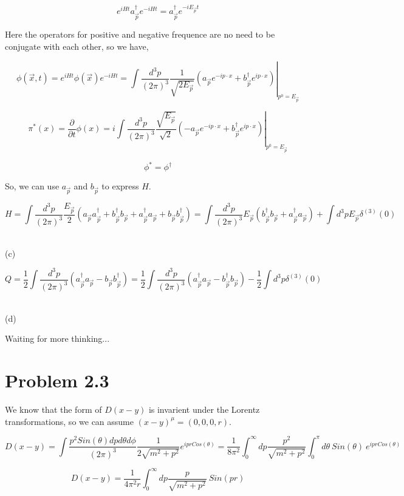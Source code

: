\documentclass[11pt]{article} %
\begin{document}
\[
    e^{i H t} a^{\dagger}_{\vec{p}} e^{-i H t}=a^{\dagger}_{\vec{p}} e^{-i E_{\vec{p}} t}    
\]

Here the operators for positive and negative frequence are no need to be conjugate with each other, so we have,

\[
    \phi(\vec{x}, t) = e^{i H t} \phi(\vec{x}) e^{-i H t} = \left.\int \frac{d^{3} p}{(2 \pi)^{3}} \frac{1}{\sqrt{2 E_{\vec{p}}}}\left(a_{\vec{p}} e^{-i p \cdot x}+b_{\vec{p}}^{\dagger} e^{i p \cdot x}\right)\right|_{p^{0}=E_{\vec{p}}}    
\]

\[
    \pi^*(x) = \frac{\partial}{\partial t} \phi(x) = i \left.\int \frac{d^{3} p}{(2 \pi)^{3}} \frac{\sqrt{E_{\vec{p}}}}{\sqrt{2}}\left( - a_{\vec{p}} e^{-i p \cdot x}+b_{\vec{p}}^{\dagger} e^{i p \cdot x}\right)\right|_{p^{0}=E_{\vec{p}}}       
\]

\[
    \phi^* = \phi^{\dagger}    
\]

So, we can use $a_{\vec{p}}$ and $b_{\vec{p}}$ to express $H$.

\[
    H = \int \frac{d^3 p}{(2\pi)^3} \frac{E_{\vec{p}}}{2} ( a_{\vec{p}} a^{\dagger}_{\vec{p}} + b^{\dagger}_{\vec{p}} b_{\vec{p}} + a^{\dagger}_{\vec{p}} a_{\vec{p}} + b_{\vec{p}} b^{\dagger}_{\vec{p}} ) = \int \frac{d^3 p}{(2\pi)^3} E_{\vec{p}} (b^{\dagger}_{\vec{p}} b_{\vec{p}} + a^{\dagger}_{\vec{p}} a_{\vec{p}}) + \int d^3 p E_{\vec{p}} \delta^{(3)}(0)
\]

~\\

\noindent (c)

\[
    Q = \frac{1}{2} \int \frac{d^3 p}{(2\pi)^3} (a^{\dagger}_{\vec{p}}a_{\vec{p}} - b_{\vec{p}}b^{\dagger}_{\vec{p}}) = \frac{1}{2} \int \frac{d^3 p}{(2\pi)^3} (a^{\dagger}_{\vec{p}}a_{\vec{p}} - b^{\dagger}_{\vec{p}}b_{\vec{p}}) - \frac{1}{2} \int d^3 p \delta^{(3)}(0)
\]


~\\

\noindent (d)

Waiting for more thinking...


\section{Problem 2.3}

We know that the form of $D(x-y)$ is invarient under the Lorentz transformations, so we can assume $(x-y)^\mu = (0, 0, 0, r)$.

\[
    D(x-y) = \int \frac{p^2 Sin(\theta) dp d\theta d\phi }{(2\pi)^3} \frac{1}{2 \sqrt{m^2 + p^2}} e^{i p r Cos(\theta)} = \frac{1}{8 \pi^2} \int^{\infty}_{0} dp \frac{p^2}{\sqrt{m^2 + p^2}} \int^{\pi}_{0} d\theta\ Sin(\theta)\ e^{i p r Cos(\theta)}
\]

\[
    D(x-y) = \frac{1}{4\pi^2 r} \int^{\infty}_{0} dp \frac{p}{\sqrt{m^2 + p^2}}\ Sin(pr)    
\]
\end{document}

